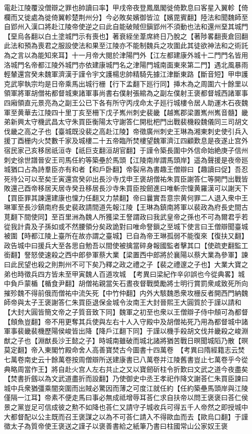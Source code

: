 電赴江陵覆没僧辯之罪也帥讀曰率】甲戌帝夜登鳳凰閣徙倚歎息曰客星入翼軫【倚欄而又徙處為徙倚翼軫楚荆州分】今必敗矣嬪御皆泣【嬪毘賓翻】陸法和聞魏師至自郢州入漢口將赴江陵帝使逆之曰此自能破賊但鎭郢州不須動也法和還州堊其城門【堊烏各翻以白土塗城門示有喪也】著衰絰坐葦席終日乃脫之【著陟畧翻喪倉回翻此法和預為喪君之服設使法和果至江陵亦不能制魏兵之攻圍此其徒欲神法和之術託為之言以為能知來耳】十一月帝大閱於津陽門外【江左都建康外城十二門門名皆用洛城門名帝都江陵外城門亦依建康城門名之津陽門城南面東來第二門】遇北風暴雨輕輦還宫癸未魏軍濟漢于謹令宇文護楊忠帥精騎先據江津斷東路【斷音短】甲申護克武寧執宗均是日帝乘馬出城行栅【行下孟翻下廵行同】挿木為之周圍六十餘里以領軍將軍胡僧祐都督城東諸軍事尚書右僕射張綰為之副左僕射王褒都督城西諸軍事四廂領直元景亮為之副王公已下各有所守丙戌命太子廵行城樓令居人助運木石夜魏軍至黄華去江陵四十里丁亥至柵下戊子嶲州刺史裴畿【越嶲郡梁置嶲州嶲音髓】畿弟新興太守機武昌太守朱買臣衡陽太守謝答仁開枇杷門出戰裴機殺魏儀同三司胡文伐畿之高之子也【臺城既没裴之高赴江陵】帝徵廣州刺史王琳為湘東刺史使引兵入援丁酉栅内火焚數千家及城樓二十五帝臨所焚樓望魏軍濟江四顧歎息是夜遂止宫外宿民家己亥移居祇洹寺【祇巨支翻洹胡官翻】于謹令築長圍中外信命始絶庚子信州刺史徐世譜晉安王司馬任約等築壘於馬頭【江陵南岸謂馬頭岸】遥為聲援是夜帝廵城猶口占為詩羣臣亦有和者【和戶卧翻】帝裂帛為書趣王僧辯曰【趣讀曰促】吾忍死待公可以至矣壬寅還宫癸卯出長沙寺戊申王褒胡僧祐朱買臣謝答仁等開門出戰皆敗還己酉帝移居天居寺癸丑移居長沙寺朱買臣按劒進曰唯斬宗懍黄羅漢可以謝天下【買臣罪其諫還建康也懍力任翻又力禁翻】帝曰曩實吾意宗黄何罪二人退入衆中王琳軍至長沙鎮南府長史裴政請間道先報江陵【王琳為鎮南將軍以裴政為府長史間古莧翻下間使同】至百里洲為魏人所獲梁王詧謂政曰我武皇帝之孫也不可為爾君乎若從我計貴及子孫如或不然腰領分矣政詭對曰唯命詧鎻之至城下使言曰王僧辯聞臺城被圍【時都江陵上臺所在故亦謂之臺城】已自為帝王琳孤弱不能復來【復扶又翻】政告城中曰援兵大至各思自勉吾以間使被擒當碎身報國監者擊其口【使疏吏翻監工銜翻】詧怒使速殺之西中郎參軍蔡大業【梁置西中郎將於襄陽以蔡大業為參軍】諫曰此民望也殺之則荆州不可下矣乃釋之政之禮之子【裴之禮邃之子也】大業大寶之弟也時徵兵四方皆未至甲寅魏人百道攻城　【考異曰梁紀作辛卯誤也今從典畧】城中負戶蒙楯【楯食尹翻】胡僧祐親當矢石晝夜督戰奬勵將士明行賞罰衆咸致死所向摧殄魏不得前俄而僧祐中流矢死【中竹仲翻】内外大駭魏悉衆攻栅反者開西門納魏師帝與太子王褒謝答仁朱買臣退保金城令汝南王大封晉熙王大圓質於于謹以請和【大封大圓皆簡文帝之子質音致下同】魏軍之初至也衆以王僧辯子侍中頠可為都督【頠魚豈翻】帝不用更奪其兵使與左右十人入守殿中及胡僧祐死乃用為都督城中諸軍事裴畿裴機歷陽侯峻皆出降【降戶江翻下同】于謹以機手殺胡文伐并畿殺之峻淵猷之子也【淵猷長沙王懿之子】時城南雖破而城北諸將猶苦戰日暝聞城䧟乃散【暝莫定翻】帝入東閣竹殿命舍人高善寶焚古今圖書十四萬卷　【考異曰隋經籍志云焚七萬卷南史云十餘萬卷按周僧辯所送建康書已八萬卷并江陵舊書豈止七萬卷乎今從典略周當作王】將自赴火宫人左右共止之又以寶劒斫柱令折歎曰文武之道今夜盡矣【焚書折劔以為文武道盡折而設翻】乃使御史中丞王孝祀作降文謝荅仁朱買臣諫曰城中兵衆猶彊乘闇突圍而出賊必驚因而薄之可度江就任約【任約築壘馬頭岸與江陵僅隔一江耳】帝素不便走馬曰事必無成祗增辱耳荅仁求自扶帝以問王褒褒曰荅仁侯景之黨豈足可信成彼之勲不如降也荅仁又請守子城收兵可得五千人帝然之即授城中大都督配以公主既而召王褒謀之以為不可荅仁請入不得歐血而去【歐烏口翻】于謹徵太子為質帝使王褒送之謹子以褒善書給之紙筆乃書曰柱國常山公家奴王褒